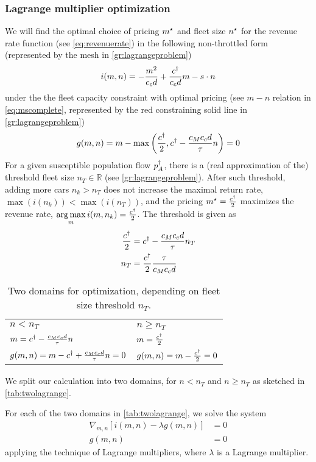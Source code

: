 \documentclass[a4paper]{report}
\DeclareMathOperator*{\argmax}{arg\,max}
\begin{document}
\newpage
\subsubsection{Lagrange multiplier optimization}
We will find the optimal choice of pricing $m^{\star}$ and fleet size $n^\star$ for the revenue rate function (see \autoref{eq:revenuerate}) in the following non-throttled form (represented by the mesh in \autoref{gr:lagrangeproblem})
\begin{equation}
	i(m,n)=-\frac{m^2}{c_cd}+\frac{c^{\dagger}}{c_cd}m-s\cdot n \label{eq:revenueratefree}
\end{equation}
under the the fleet capacity constraint with optimal pricing (see $m-n$ relation in \autoref{eq:mscomplete}, represented by the red constraining solid line in \autoref{gr:lagrangeproblem})
\begin{equation}
	g(m,n)=m - \max\left(\frac{c^{\dagger}}{2},c^{\dagger}-\frac{c_Mc_cd}{\tau}n\right)=0 \label{eq:lagrangeconst}
\end{equation}
For a given susceptible population flow $p_A^{\dagger}$, there is a (real approximation of the) threshold fleet size $n_T\in \mathbb{R}$ (see \autoref{gr:lagrangeproblem}). After such threshold, adding more cars $n_k>n_T$ does not increase the maximal return rate, $\max(i(n_k)) < \max(i(n_T))$, and the pricing $m^{\star}=\frac{c^{\dagger}}{2}$ maximizes the revenue rate, $\argmax\limits_{m} i(m,n_k)=\frac{\cd}{2}$. The threshold is given as
\begin{align}
	\frac{c^{\dagger}}{2}&=c^{\dagger}-\frac{c_Mc_cd}{\tau} n_T \nonumber\\
	n_T&=\frac{c^{\dagger}}{2}\frac{\tau}{c_Mc_cd} \label{eq:threshn}
\end{align}

\begin{table}[h!]
	\centering
	\begin{tabular}{p{}| p{}}
		$n < n_T$					& $n \geq n_T$ \\
		$m = c^{\dagger} - \frac{c_Mc_cd}{\tau} n$			& $m = \frac{c^{\dagger}}{2}$ \\
		$g(m,n)= m - c^{\dagger} + \frac{c_Mc_cd}{\tau} n = 0$	& $g(m,n) = m - \frac{c^{\dagger}}{2} = 0$\\ 
	\end{tabular}
	\caption{Two domains for optimization, depending on fleet size threshold $n_T$.}
	\label{tab:twolagrange}
\end{table}

We split our calculation into two domains, for $n<n_T$ and $n\geq n_T$ as sketched in \autoref{tab:twolagrange}.

For each of the two domains in \autoref{tab:twolagrange}, we solve the system
\begin{align*}
	\nabla_{m,n} \left[i(m,n)-\lambda g(m,n)\right]&=0\\
	g(m,n)&=0
\end{align*}
applying the technique of Lagrange multipliers, where $\lambda$ is a Lagrange multiplier.
\end{document}
